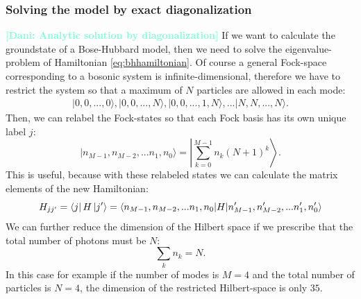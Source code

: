 \documentclass[12pt, a4paper,  nobibnotes]{article}
\newcommand{\nd}[1]{\textcolor{Aquamarine}{\textbf{[Dani: #1]}}}
\begin{document}
\subsubsection{Solving the model by exact diagonalization}
\nd{Analytic solution by diagonalization}
If we want to calculate the groundstate of a Bose-Hubbard model, then we need to solve the 
eigenvalue-problem of Hamiltonian \ref{eq:bhhamiltonian}.
Of course a general Fock-space corresponding to a bosonic system is infinite-dimensional, therefore
we have to restrict the system so that a maximum of $N$ particles are allowed in each mode:
\begin{align*}
|0,0, ..., 0\rangle, |0,0, ..., N\rangle, |0,0, ..., 1, N\rangle, ... |N,N,...,N\rangle.
\end{align*}
Then, we can relabel the Fock-states so that each Fock basis has its own unique label $j$:
\begin{equation}
|n_{M-1}, n_{M-2}, ... n_{1}, n_{0}\rangle = \left|\sum\limits_{k=0}^{M-1}n_{k}(N+1)^{k}\right\rangle.
\end{equation}
This is useful, because with these relabeled states we can calculate the matrix elements of the new 
Hamiltonian:
\begin{equation}
    H_{jj'} = \bra{j}H\ket{j'} = \langle n_{M-1}, n_{M-2}, ... n_{1}, n_{0}| H |n'_{M-1}, n'_{M-2}, ... n'_{1}, n'_{0}\rangle
\end{equation}
We can further reduce the dimension of the Hilbert space if we prescribe that the total number of photons
must be $N$:
\begin{equation*}
    \sum\limits_kn_k = N.
\end{equation*}
In this case for example if the number of modes is $M=4$ and the total number of particles is $N=4$,
the dimension of the restricted Hilbert-space is only $35$.
\end{document}
